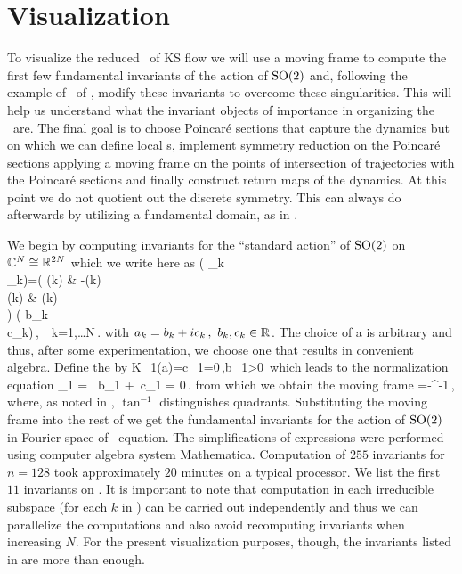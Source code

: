 \section{Visualization}
\label{sec:KSeMF}

To visualize the reduced \statesp\ of KS flow we will use a
moving frame to compute the first few fundamental invariants
of the action of $\textrm{SO}(2)$ and, following the example of
\CLe\ of , modify these invariants to
overcome these singularities. This will help us understand
what the invariant objects of importance in organizing the
\statesp\ are. The final goal is to choose Poincar\'e
sections that capture the dynamics but on which we can define
local {\csection}s, implement symmetry reduction on the
Poincar\'e sections applying a moving frame on the points of
intersection of trajectories with the Poincar\'e sections and
finally construct return maps of the dynamics. At
this point we do not quotient out the discrete symmetry. This
can always do afterwards by utilizing a fundamental domain,
as in .


We begin by computing invariants for the ``standard action''
 of $\textrm{SO}(2)$ on $\mathbb{C}^{N}\cong\mathbb{R}^{2N}$
which we write here as
\beq
	\left( _k \\ _k\earr \right)=\left(
			    			\cos(k\theta) & -\sin(k\theta)\\
						\sin(k\theta) & \cos(k\theta)\\
			   			\earr	
						\right) \left( b_k \\ c_k\earr\right)\,,\ \ k=1,\ldots N\,.
	\label{eq:SO2stand}
\eeq
with $a_k=b_k+i c_k\,,\ b_k,c_k\in\mathbb{R}^{}$.
The choice of a {\csection} is arbitrary and thus, after some
experimentation, we choose one that results in convenient
algebra.
Define the {\csection} by
\beq
 	K_1(a)=c_1=0\,,\qquad b_1>0\,
\eeq
which leads to the normalization equation
\beq
	_1 = \sin\theta\, b_1 +\cos\theta\, c_1 = 0\,.
	\label{eq:SO2norm}
\eeq
from which we obtain the moving frame
\beq
	\theta=-\tan^{-1}\,,
	\label{eq:SO2stand1}
\eeq
where, as noted in , $\tan^{-1}$
distinguishes quadrants. Substituting the moving frame into
the rest of  we get the fundamental
invariants for the action of $\textrm{SO}(2)$ in Fourier space of
\KS\ equation. The simplifications of expressions were
performed using computer algebra system Mathematica.
Computation of $255$ invariants for $n=128$ took
approximately $20$ minutes on a typical processor. We list
the first $11$ invariants on . It is
important to note that computation in each irreducible
subspace (for each $k$ in ) can be carried
out independently and thus we can parallelize the
computations and also avoid recomputing invariants when
increasing $N$. For the present visualization purposes,
though, the  invariants listed in  are more
than enough.


